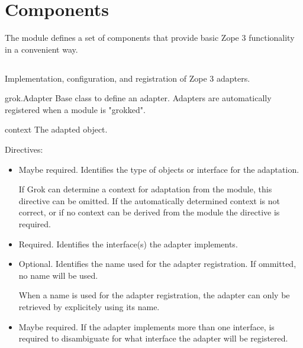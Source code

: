 \chapter{Components}

The  module defines a set of components that provide basic Zope 3
functionality in a convenient way.

\section{}

  Implementation, configuration, and registration of Zope 3 adapters.

  \begin{classdesc*}{grok.Adapter}
    Base class to define an adapter. Adapters are automatically registered when
    a module is "grokked".

    \begin{memberdesc}{context}
      The adapted object.
    \end{memberdesc}

  \begin{bf}Directives:\end{bf}

  \begin{itemize}
    \item[\function{grok.context(context_obj_or_interface)}] Maybe required.
    Identifies the type of objects or interface for the adaptation.

    If Grok can determine a context for adaptation from the module, this
    directive can be omitted. If the automatically determined context is not
    correct, or if no context can be derived from the module the directive is
    required.

    \item[\function{grok.implements(*interfaces)}] Required. Identifies the
    interface(s) the adapter implements.

    \item[\function{grok.name(name)}] Optional. Identifies the name used for
    the adapter registration. If ommitted, no name will be used.

    When a name is used for the adapter registration, the adapter can only be
    retrieved by explicitely using its name.

    \item[\function{grok.provides(name)}] Maybe required. If the adapter
    implements more than one interface,  is required to
    disambiguate for what interface the adapter will be registered.
  \end{itemize}
  \end{classdesc*}

